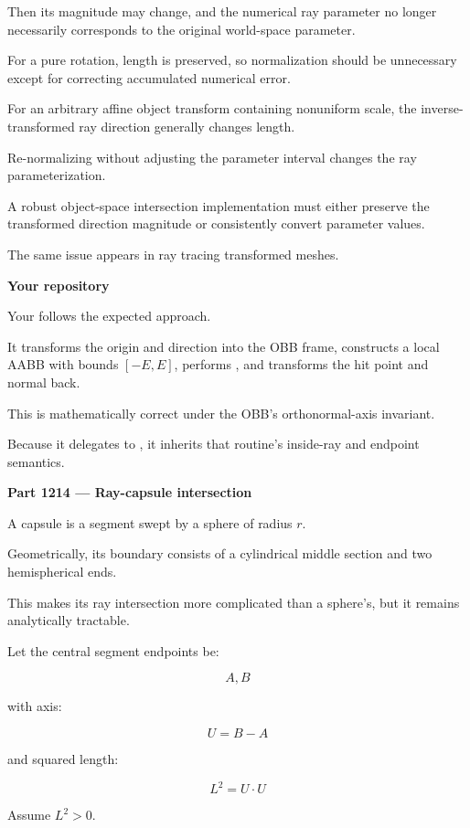 Then its magnitude may change, and the numerical ray parameter no longer necessarily corresponds to the original world-space parameter.

For a pure rotation, length is preserved, so normalization should be unnecessary except for correcting accumulated numerical error.

For an arbitrary affine object transform containing nonuniform scale, the inverse-transformed ray direction generally changes length.

Re-normalizing without adjusting the parameter interval changes the ray parameterization.

A robust object-space intersection implementation must either preserve the transformed direction magnitude or consistently convert parameter values.

The same issue appears in ray tracing transformed meshes.

\textbf{Your repository}

Your  follows the expected approach.

It transforms the origin and direction into the OBB frame, constructs a local AABB with bounds \([-E,E]\), performs , and transforms the hit point and normal back.

This is mathematically correct under the OBB's orthonormal-axis invariant.

Because it delegates to , it inherits that routine's inside-ray and endpoint semantics.

\textbf{Part 1214 --- Ray-capsule intersection}

A capsule is a segment swept by a sphere of radius \(r\).

Geometrically, its boundary consists of a cylindrical middle section and two hemispherical ends.

This makes its ray intersection more complicated than a sphere's, but it remains analytically tractable.

Let the central segment endpoints be:

\[
A,B
\]

with axis:

\[
U=B-A
\]

and squared length:

\[
L^2=U\cdot U
\]

Assume \(L^2>0\).


